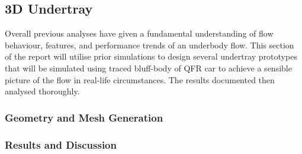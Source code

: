 
\subsection{3D Undertray}
Overall previous analyses have given a fundamental understanding of flow behaviour, features, and performance trends of an underbody flow. This section of the report will utilise prior simulations to design several undertray prototypes that will be simulated using traced bluff-body of QFR car to achieve a sensible picture of the flow in real-life circumstances. The results documented then analysed thoroughly.

\subsubsection{Geometry and Mesh Generation}


\subsubsection{Results and Discussion}




















